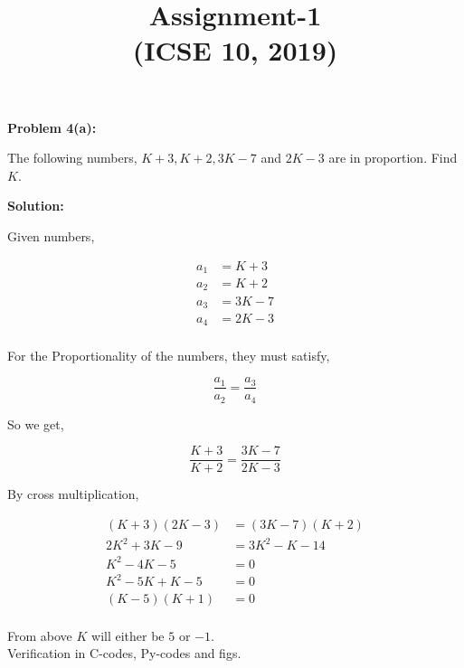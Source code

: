 \documentclass[11pt]{article}
\title{\LARGE{\textbf{Assignment-1}\\(ICSE 10, 2019)}}
\date{}
\begin{document}
\maketitle
\begin{multicols}{2}	

\begin{center}
    \textbf{\large Problem 4(a):}
\end{center}
\begin{flushleft}
The following numbers, $K + 3, K + 2, 3K - 7$ and $2K - 3$ are in proportion. Find $K$.\\[2\baselineskip]
\end{flushleft}
\begin{center}
    \textbf{\large Solution:}
\end{center}

\noindent Given numbers,

\begin{align*}
a_1 & = K + 3\\
a_2 & = K + 2\\
a_3 & = 3K - 7\\
a_4 & = 2K - 3\\
\end{align*}

\noindent For the Proportionality of the numbers, they must satisfy,

\[ \frac{a_1}{a_2} = \frac{a_3}{a_4} \]

\noindent So we get,

\[ \frac{K + 3}{K + 2} = \frac{3K - 7}{2K - 3} \]

\noindent By cross multiplication,

\begin{align*}
    (K + 3)(2K - 3) & = (3K - 7)(K + 2)\\
    2K^2 + 3K - 9 & = 3K^2 - K - 14\\
    K^2 - 4K - 5 & = 0\\
    K^2 - 5K + K - 5 & = 0\\
    (K - 5)(K + 1) & = 0\\
\end{align*}

\noindent From above $K$ will either be $5$ or $-1$.\\ [\baselineskip] 
Verification in C-codes, Py-codes and figs.

\end{multicols}
\end{document}
